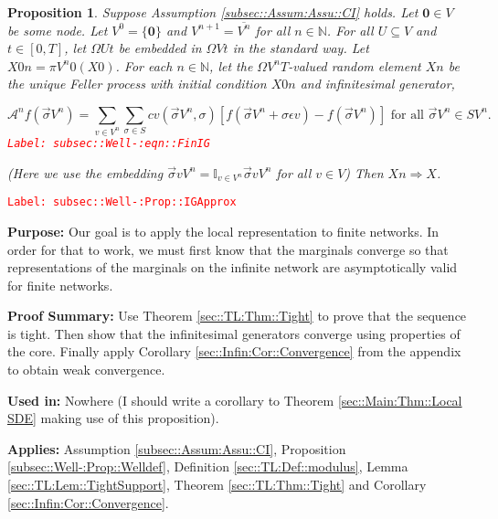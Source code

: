 \documentclass[12pt]{article}
\newcommand{\mb}{\mathbb}
\newcommand{\mc}{\mathcal}
\newcommand{\ov}{\overline}
\newcommand{\te}{\text}
\newcommand{\ep}{\epsilon}
\newcommand{\tr}{\textcolor{red}}
\newcommand{\labe}[1]{\tr{\texttt{Label: #1}}}
\newcommand{\purpose}{\textbf{Purpose: }}
\newcommand{\pfsum}{\textbf{Proof Summary: }}
\newcommand{\usein}{\textbf{Used in: }}
\newcommand{\app}{\textbf{Applies: }}
\renewcommand{\root}{\mathbf{0}}				%
\renewcommand{\v}{v}							%
\renewcommand{\U}{U}							%
\renewcommand{\S}{S}							%
\newcommand{\s}{\sigma}							%
\newcommand{\sv}{\vec{\s}}						%
\newcommand{\ev}{\ep}							%
\newcommand{\T}{T}								%
\renewcommand{\t}{t}							%
\newcommand{\proj}{\pi}							%
\newcommand{\X}{X}								%
\newcommand{\IG}{\mc{A}}						%
\newcommand{\IGr}{c}							%
\newcommand{\cl}{\ov}							%
\newcommand{\sln}[1]{^{#1}}						%
\newtheorem{prop}[thms]{Proposition}
\begin{document}
\begin{prop}
Suppose Assumption \ref{subsec::Assum:Assu::CI} holds. Let \(\root \in V\) be some node. Let \(V\sln{0} = \{\root\}\) and \(V\sln{n+1} = \cl{V\sln{n}}\) for all \(n \in \mb{N}\). For all \(\U \subseteq V\) and \(\t \in [0,\T]\), let \(\Omega{\U}{\t}\) be embedded in \(\Omega{V}{\t}\) in the standard way. Let \(\X{}{0}{n} = \proj{V\sln{n}}{0}(\X{}{0})\). For each \(n\in\mb{N}\), let the \(\Omega{V\sln{n}}{\T}\)-valued random element \(\X{}{}{n}\) be the unique Feller process with initial condition \(\X{}{0}{n}\) and infinitesimal generator,

\begin{equation}
\IG\sln{n}f(\sv{}{V\sln{n}}) = \sum_{\v\in V\sln{n}}\sum_{\s\in \S} \IGr{\v}(\sv{}{V\sln{n}}, \s)[f(\sv{}{V\sln{n}} + \s\ev{\v}) - f(\sv{}{V\sln{n}})]\te{ for all } \sv{}{V\sln{n}} \in \S{V\sln{n}}.
\label{subsec::Well-:eqn::FinIG}
\end{equation}
\labe{subsec::Well-:eqn::FinIG}

(Here we use the embedding \(\sv{\v}{V\sln{n}} = \mb{I}_{\v\in V\sln{n}} \sv{\v}{V\sln{n}}\) for all \(\v \in V\)) Then \(\X{}{}{n} \Rightarrow \X{}{}\).
\label{subsec::Well-:Prop::IGApprox}
\end{prop}
\labe{subsec::Well-:Prop::IGApprox}

\purpose Our goal is to apply the local representation to finite networks. In order for that to work, we must first know that the marginals converge so that representations of the marginals on the infinite network are asymptotically valid for finite networks.

\pfsum Use Theorem \ref{sec::TL:Thm::Tight} to prove that the sequence is tight. Then show that the infinitesimal generators converge using properties of the core. Finally apply Corollary \ref{sec::Infin:Cor::Convergence} from the appendix to obtain weak convergence.

\usein Nowhere (I should write a corollary to Theorem \ref{sec::Main:Thm::Local SDE} making use of this proposition).

\app Assumption \ref{subsec::Assum:Assu::CI}, Proposition \ref{subsec::Well-:Prop::Welldef}, Definition \ref{sec::TL:Def::modulus}, Lemma \ref{sec::TL:Lem::TightSupport}, Theorem \ref{sec::TL:Thm::Tight} and Corollary \ref{sec::Infin:Cor::Convergence}.
\end{document}
